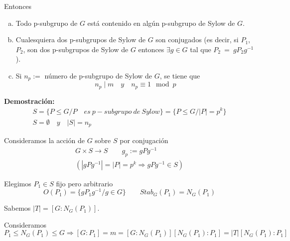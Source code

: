 \documentclass{article}
\begin{document}
Entonces
\begin{enumerate}[(a)]
\item Todo p-subgrupo de $G$ está contenido en algún p-subgrupo de Sylow de $G$.

\item Cualesquiera dos p-subgrupos de Sylow de $G$ son conjugados (es decir, si $P_1$, $P_2$, son dos p-subgrupos de Sylow de $G$ entonces $\exists g\in G$ tal que $P_2~=~gP_2g^{-1}$).

\item Si $n_p:=$ número de p-subgrupo de Sylow de $G$, se tiene que
\begin{equation*}
n_p\mid m\quad y\quad n_p\equiv 1\mod{p}
\end{equation*}
\end{enumerate}

\textbf{Demostración:}
\begin{gather*}
S=\{P\leq G/P\quad es\:p-subgrupo\:de\:Sylow\}=\{P\leq G/|P|=p^k\} \\
S=\emptyset \quad y\quad |S|=n_p
\end{gather*}

Consideramos la acción de $G$ sobre $S$ por conjugación
\begin{gather*}
G\times S\longrightarrow S\qquad g_p:=gPg^{-1} \\
(|gPg^{-1}|=|P|=p^k\Rightarrow gPg^{-1}\in S)
\end{gather*}

Elegimos $P_1\in S$ fijo pero arbitrario
\begin{equation*}
O(P_1)=\{gP_1g^{-1}/g\in G\} \qquad Stab_G(P_1)=N_G(P_1)
\end{equation*}

Sabemos $|T|=\left[G:N_G(P_1)\right]$.

Consideramos 
\begin{equation*}
P_1\leq N_G(P_1)\leq G\Rightarrow\left[G:P_1\right]=m=\left[G:N_G(P_1)\right]\left[N_G(P_1):P_1\right]=|T|\left[N_G(P_1):P_1\right]
\end{equation*}
\end{document}
